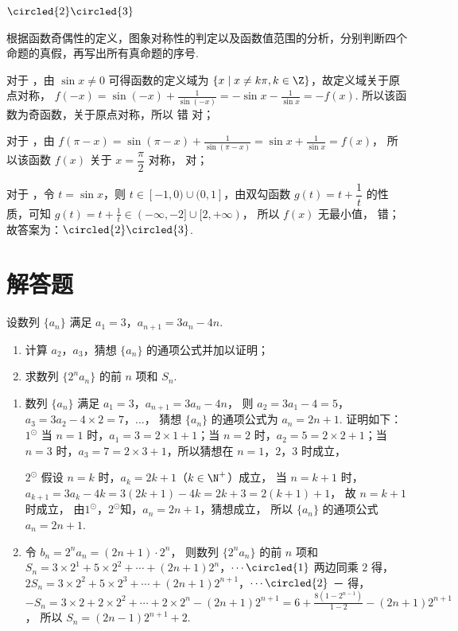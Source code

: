 \begin{answer}
\(\circled{2}\circled{3}\)
\end{answer}

\begin{solution}
根据函数奇偶性的定义，图象对称性的判定以及函数值范围的分析，分别判断四个命题的真假，再写出所有真命题的序号.

对于 ，由 \(\sin x\ne0\) 可得函数的定义域为 \(\{x\mid x\ne k\pi,k\in \Z\}\)，故定义域关于原点对称，
\(f(-x)=\sin(-x)+\frac{1}{\sin(-x)}=-\sin x-\frac{1}{\sin x}=-f(x)\).
所以该函数为奇函数，关于原点对称，所以  错  对；

对于 ，由
\(f(\pi-x)=\sin(\pi-x)+\frac{1}{\sin(\pi-x)}=\sin x+\frac{1}{\sin x}=f(x)\)，
所以该函数 \(f(x)\) 关于 \(x=\dfrac{\pi}{2}\) 对称， 对；

对于 ，令 \(t=\sin x\)，则 \(t\in[-1,0)\cup(0,1]\)，由双勾函数 \(g(t)=t+\dfrac{1}{t}\) 的性质，可知
\(g(t)=t+\frac{1}{t}\in(-\infty,-2]\cup[2,+\infty)\)，
所以 \(f(x)\) 无最小值， 错；
故答案为：\(\circled{2}\circled{3}\).
\end{solution}
\section{解答题}

\begin{problem}
设数列 \(\{a_n\}\) 满足 \(a_1=3\)，\(a_{n+1}=3a_n-4n\).

\begin{enumerate}
\item 计算 \(a_2\)，\(a_3\)，猜想 \(\{a_n\}\) 的通项公式并加以证明；
\item 求数列 \(\{2^na_n\}\) 的前 \(n\) 项和 \(S_n\).
\end{enumerate}
\end{problem}

\begin{solution}
\begin{enumerate}
\item 数列 \(\{a_n\}\) 满足 \(a_1=3\)，\(a_{n+1}=3a_n-4n\)，
则 \(a_2=3a_1-4=5\)，\(a_3=3a_2-4\times2=7\)，...，
猜想 \(\{a_n\}\) 的通项公式为 \(a_n=2n+1\).
证明如下：\(1^{\odot}\) 当 \(n=1\) 时，\(a_1=3=2\times1+1\)；当 \(n=2\) 时，\(a_2=5=2\times2+1\)；当 \(n=3\) 时，\(a_3=7=2\times3+1\)，所以猜想在 \(n=1\)，\(2\)，\(3\) 时成立，

\(2^{\odot}\) 假设 \(n=k\) 时，\(a_k=2k+1\)（\(k\in \N^+\)）成立，
当 \(n=k+1\) 时，
\(a_{k+1}=3a_k-4k=3(2k+1)-4k=2k+3=2(k+1)+1\)，
故 \(n=k+1\) 时成立，
由\(1^{\odot}\)，\(2^{\odot}\)知，\(a_n=2n+1\)，猜想成立，
所以 \(\{a_n\}\) 的通项公式 \(a_n=2n+1\).

\item 令
\(b_n=2^na_n=(2n+1)\cdot2^n\)，
则数列 \(\{2^na_n\}\) 的前 \(n\) 项和
\(S_n=3\times2^1+5\times2^2+\cdots+(2n+1)2^n\)，\(\cdots\circled{1}\)
两边同乘 \(2\) 得，
\(2S_n=3\times2^2+5\times2^3+\cdots+(2n+1)2^{n+1}\)，\(\cdots\circled{2}\)
－ 得，
\(-S_n=3\times2+2\times2^2+\cdots+2\times2^n-(2n+1)2^{n+1} =6+\frac{8(1-2^{n-1})}{1-2}-(2n+1)2^{n+1}\)，
所以
\(S_n=(2n-1)2^{n+1}+2\).
\end{enumerate}
\end{solution}

